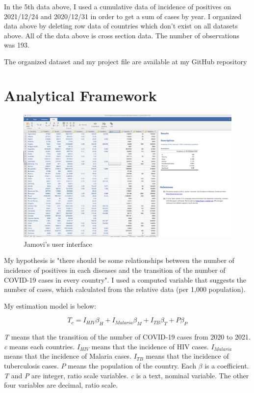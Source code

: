 \documentclass[12pt]{report}
\begin{document}
In the 5th data above, I used a cumulative data of incidence of positives on 2021/12/24 and 2020/12/31 in order to get a sum of cases by year.
I organized data above by deleting row data of countries which don't exist on all datasets above.
All of the data above is cross section data. 
The number of observations was 193.


The organized dataset and my project file are available at my GitHub repository\cite{github}

\chapter{Analytical Framework}

\begin{figure}
    \centering
    \includegraphics[width=140mm]{img/jamovi.png}
    \caption{Jamovi's user interface}
    \label{fig:jamovi}
\end{figure}

My hypothesis is "there should be some relationships between the number of incidence of positives in each diseases and the transition of the number of COVID-19 cases in every country".
I used a computed variable that suggests the number of cases, which calculated from the relative data (per 1,000 population).

My estimation model is below:

\begin{equation}
    T_c = I_{HIV}\beta_H + I_{Malaria}\beta_M + I_{TB}\beta_T + P\beta_P
\end{equation}

{\it{T}} means that the transition of the number of COVID-19 cases from 2020 to 2021.
{\it{c}} means each countries.
{\it{$I_{HIV}$}} means that the incidence of HIV cases.
{\it{$I_{Malaria}$}} means that the incidence of Malaria cases.
{\it{$I_{TB}$}} means that the incidence of tuberculosis cases.
{\it{$P$}} means the population of the country.
Each {$\beta$} is a coefficient.
{\it{T}} and {\it{P}} are integer, ratio scale variables.
{\it{c}} is a text, nominal variable.
The other four variables are decimal, ratio scale.
\end{document}
